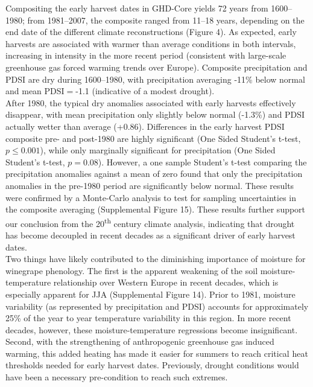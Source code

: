 \documentclass[final]{nature}
\begin{document}
\indent Compositing the early harvest dates in GHD-Core yields 72 years from 1600--1980; from 1981--2007, the composite ranged from 11--18 years, depending on the end date of the different climate reconstructions (Figure 4). As expected, early harvests are associated with warmer than average conditions in both intervals, increasing in intensity in the more recent period (consistent with large-scale greenhouse gas forced warming trends over Europe). Composite precipitation and PDSI are dry during 1600--1980, with precipitation averaging -11\% below normal and mean PDSI$=$-1.1 (indicative of a modest drought).\\
\indent After 1980, the typical dry anomalies associated with early harvests effectively disappear, with mean precipitation only slightly below normal (-1.3\%) and PDSI actually wetter than average (+0.86). Differences in the early harvest PDSI composite pre- and post-1980 are highly significant (One Sided Student's t-test, $p\le0.001$), while only marginally significant for precipitation (One Sided Student's t-test, $p=0.08$). However, a one sample Student's t-test comparing the precipitation anomalies against a mean of zero found that only the precipitation anomalies in the pre-1980 period are significantly below normal. These results were confirmed by a Monte-Carlo analysis to test for sampling uncertainties in the composite averaging (Supplemental Figure 15). These results further support our conclusion from the 20\textsuperscript{th} century climate analysis, indicating that drought has become decoupled in recent decades as a significant driver of early harvest dates.\\
\indent Two things have likely contributed to the diminishing importance of moisture for winegrape phenology. The first is the apparent weakening of the soil moisture-temperature relationship over Western Europe in recent decades, which is especially apparent for JJA (Supplemental Figure 14). Prior to 1981, moisture variability (as represented by precipitation and PDSI) accounts for approximately 25\% of the year to year temperature variability in this region. In more recent decades, however, these moisture-temperature regressions become insignificant. Second, with the strengthening of anthropogenic greenhouse gas induced warming, this added heating has made it easier for summers to reach critical heat thresholds needed for early harvest dates. Previously, drought conditions would have been a necessary pre-condition to reach such extremes.\\
\end{document}
